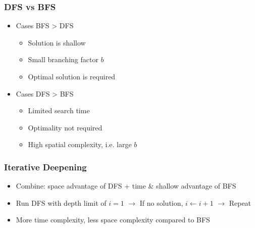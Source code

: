 \subsubsection*{DFS vs BFS}
\begin{itemize}
    \item Cases BFS > DFS
    \begin{itemize}
        \item Solution is shallow
        \item Small branching factor $b$
        \item Optimal solution is required
    \end{itemize}
    \item Cases DFS > BFS
    \begin{itemize}
        \item Limited search time
        \item Optimality not required
        \item High spatial complexity, i.e. large $b$
    \end{itemize}
\end{itemize}

\subsubsection*{Iterative Deepening}
\begin{itemize}
    \item Combine: space advantage of DFS + time \& shallow advantage of BFS
    \item Run DFS with depth limit of $i=1$ $\to$ If no solution, $i\leftarrow i+1$ $\to$ Repeat
    \item More time complexity, less space complexity compared to BFS
\end{itemize}


